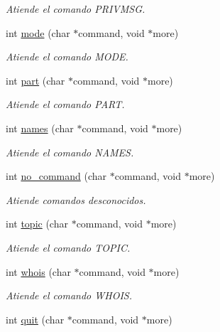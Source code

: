 \begin{DoxyCompactItemize}
\begin{DoxyCompactList}\small\item\em Atiende el comando P\+R\+I\+V\+M\+S\+G. \end{DoxyCompactList}\item 
int \hyperlink{G-2301-01-P1-irc_8c_acf0a22b987d84e40e761be7e8890b1d8}{mode} (char $\ast$command, void $\ast$more)
\begin{DoxyCompactList}\small\item\em Atiende el comando M\+O\+D\+E. \end{DoxyCompactList}\item 
int \hyperlink{G-2301-01-P1-irc_8c_ab4883f7a980b3abfb6aa96c00f3dcdba}{part} (char $\ast$command, void $\ast$more)
\begin{DoxyCompactList}\small\item\em Atiende el comando P\+A\+R\+T. \end{DoxyCompactList}\item 
int \hyperlink{G-2301-01-P1-irc_8c_a06b78ae62a4b7cebfff1d57e06f0d608}{names} (char $\ast$command, void $\ast$more)
\begin{DoxyCompactList}\small\item\em Atiende el comando N\+A\+M\+E\+S. \end{DoxyCompactList}\item 
int \hyperlink{G-2301-01-P1-irc_8c_a62d6e584670627b2ff2e3012aaa615b0}{no\+\_\+command} (char $\ast$command, void $\ast$more)
\begin{DoxyCompactList}\small\item\em Atiende comandos desconocidos. \end{DoxyCompactList}\item 
int \hyperlink{G-2301-01-P1-irc_8c_a794e39cc731b5facd32b37af09f1ce7a}{topic} (char $\ast$command, void $\ast$more)
\begin{DoxyCompactList}\small\item\em Atiende el comando T\+O\+P\+I\+C. \end{DoxyCompactList}\item 
int \hyperlink{G-2301-01-P1-irc_8c_a8aef52731434e5afb95607d57ab248ab}{whois} (char $\ast$command, void $\ast$more)
\begin{DoxyCompactList}\small\item\em Atiende el comando W\+H\+O\+I\+S. \end{DoxyCompactList}\item 
int \hyperlink{G-2301-01-P1-irc_8c_a7770fb823845c97fc6cdfa2e369b1f88}{quit} (char $\ast$command, void $\ast$more)

\end{DoxyCompactItemize}
